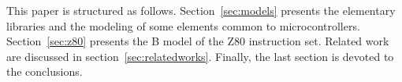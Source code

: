 \documentclass[a4paper]{llncs}
\begin{document}
%
% 

%

This paper is structured as follows.  Section~\ref{sec:models}
presents the elementary libraries and the modeling of some elements
common to microcontrollers.  Section~\ref{sec:z80} presents the B
model of the Z80 instruction set.  Related work are discussed in
section~\ref{sec:relatedworks}. Finally, the last section is devoted
to the conclusions.
\end{document}
